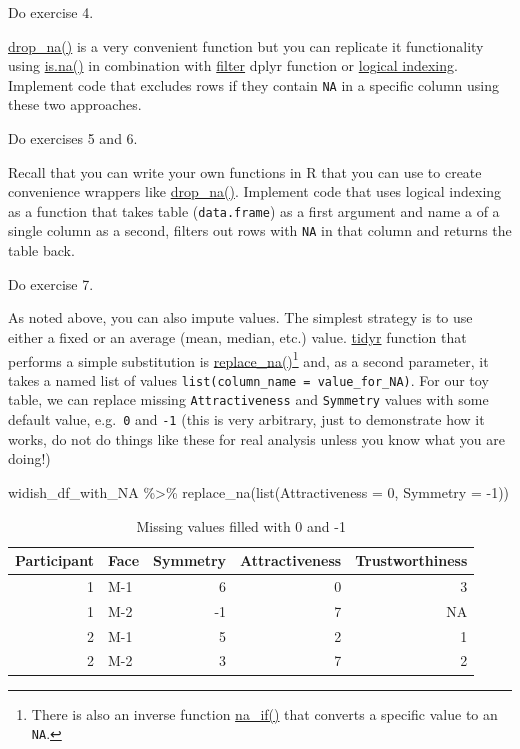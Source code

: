 \documentclass[
]{book}
\newenvironment{Shaded}{\begin{snugshade}}{\end{snugshade}}
\newcommand{\AttributeTok}[1]{\textcolor[rgb]{0.77,0.63,0.00}{#1}}
\newcommand{\DecValTok}[1]{\textcolor[rgb]{0.00,0.00,0.81}{#1}}
\newcommand{\FunctionTok}[1]{\textcolor[rgb]{0.00,0.00,0.00}{#1}}
\newcommand{\NormalTok}[1]{#1}
\newcommand{\SpecialCharTok}[1]{\textcolor[rgb]{0.00,0.00,0.00}{#1}}
\begin{document}
Do exercise 4.

\href{https://tidyr.tidyverse.org/reference/drop_na.html}{drop\_na()} is a very convenient function but you can replicate it functionality using \href{https://stat.ethz.ch/R-manual/R-devel/library/base/html/NA.html}{is.na()} in combination with \href{https://dplyr.tidyverse.org/reference/filter.html}{filter} dplyr function or \href{logical-indexing}{logical indexing}. Implement code that excludes rows if they contain \texttt{NA} in a specific column using these two approaches.

Do exercises 5 and 6.

Recall that you can write your own functions in R that you can use to create convenience wrappers like \href{https://tidyr.tidyverse.org/reference/drop_na.html}{drop\_na()}. Implement code that uses logical indexing as a function that takes table (\texttt{data.frame}) as a first argument and name a of a single column as a second, filters out rows with \texttt{NA} in that column and returns the table back.

Do exercise 7.

As noted above, you can also impute values. The simplest strategy is to use either a fixed or an average (mean, median, etc.) value. \href{https://tidyr.tidyverse.org/}{tidyr} function that performs a simple substitution is \href{https://tidyr.tidyverse.org/reference/replace_na.html}{replace\_na()}\footnote{There is also an inverse function \href{https://dplyr.tidyverse.org/reference/na_if.html}{na\_if()} that converts a specific value to an \texttt{NA}.} and, as a second parameter, it takes a named list of values \texttt{list(column\_name\ =\ value\_for\_NA)}. For our toy table, we can replace missing \texttt{Attractiveness} and \texttt{Symmetry} values with some default value, e.g.~\texttt{0} and \texttt{-1} (this is very arbitrary, just to demonstrate how it works, do not do things like these for real analysis unless you know what you are doing!)

\begin{Shaded}
\begin{Highlighting}[]
\NormalTok{widish\_df\_with\_NA }\SpecialCharTok{\%\textgreater{}\%}
  \FunctionTok{replace\_na}\NormalTok{(}\FunctionTok{list}\NormalTok{(}\AttributeTok{Attractiveness =} \DecValTok{0}\NormalTok{, }\AttributeTok{Symmetry =} \SpecialCharTok{{-}}\DecValTok{1}\NormalTok{)) }
\end{Highlighting}
\end{Shaded}

\begin{table}

\caption{\label{tab:unnamed-chunk-286}Missing values filled with 0 and -1}
\centering
\begin{tabular}[t]{r|l|r|r|r}
\hline
Participant & Face & Symmetry & Attractiveness & Trustworthiness\\
\hline
1 & M-1 & 6 & 0 & 3\\
\hline
1 & M-2 & -1 & 7 & NA\\
\hline
2 & M-1 & 5 & 2 & 1\\
\hline
2 & M-2 & 3 & 7 & 2\\
\hline
\end{tabular}
\end{table}
\end{document}
